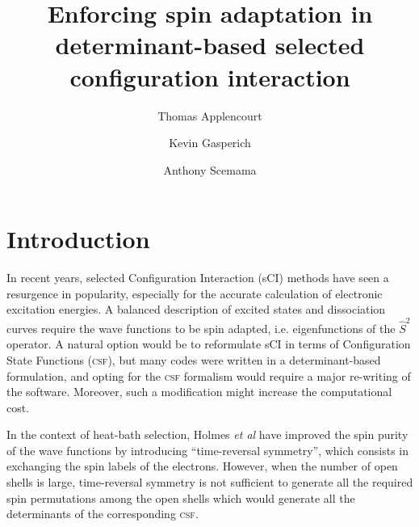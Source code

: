 \documentclass[aip,jcp,reprint,showkeys]{revtex4-1}
\newcommand{\stwo}{\hat{S}^2}
\newcommand{\csf}{\textsc{csf}}
\begin{document}
\title{Enforcing spin adaptation in determinant-based selected configuration
interaction}

\author{Thomas Applencourt}
\author{Kevin Gasperich}
\author{Anthony Scemama}

\begin{abstract}
\end{abstract}


\maketitle

\section{Introduction}

In recent years, selected Configuration Interaction (sCI) methods have seen a resurgence in
popularity,\cite{Greer_1998,Stampfuss_2005,Bytautas_2009,Booth_2009,Giner_2013,Buenker_2014,Holmes_2016,Ohtsuka_2017,Coe_2018}
especially for the accurate calculation of electronic excitation
energies.\cite{Coe_2013,Schriber_2017,Holmes_2017,Loos_2018,Scemama_2018,Dash_2018}
A balanced description of excited states and dissociation curves require
the wave functions to be spin adapted, i.e. eigenfunctions of the $\stwo$
operator. A natural option would be to reformulate sCI in terms of
Configuration State Functions (\csf), but many codes were written in a
determinant-based formulation, and opting for the {\csf} formalism would require
a major re-writing of the software. Moreover, such a modification might
increase the computational cost.\cite{Knowles_1984,Olsen_1988}

In the context of heat-bath selection, Holmes \textit{et al} have 
improved the spin purity of the wave functions by introducing ``time-reversal
symmetry''\cite{Holmes_2017}, which consists in exchanging the spin labels of
the electrons.
However, when the number of open shells is large, time-reversal symmetry is not
sufficient to generate all the required spin permutations among the open shells
which would generate all the determinants of the corresponding \csf.
\end{document}
